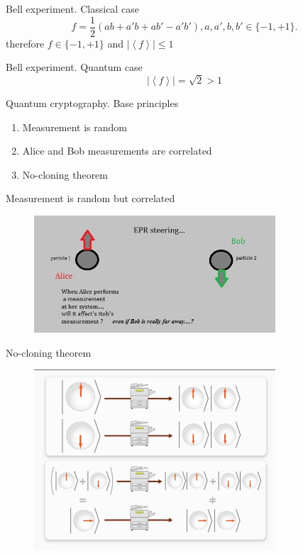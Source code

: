 \documentclass[10pt,pdf,hyperref={unicode}]{beamer}
\begin{document}
\begin{frame}{Bell experiment. Classical case}
\[
f = \frac{1}{2}\left(
a b + a' b + a b' - a' b'
\right), a,a',b,b' \in \{-1, +1\}.
\]
therefore
\(
f \in \{-1, +1\}
\)
and
\(
\left|\left<f\right>\right| \le 1
\)
\end{frame}

\begin{frame}{Bell experiment. Quantum case}
\[
\left|\left<f\right>\right| = \sqrt{2} > 1
\]
\end{frame}

\begin{frame}{Quantum cryptography. Base principles}
  \begin{enumerate}
  \item Measurement is random
  \item Alice and Bob measurements are correlated
  \item No-cloning theorem
  \end{enumerate}
\end{frame}

\begin{frame}{Measurement is random but correlated}
 \begin{figure} 
   \includegraphics[width=90mm,scale=0.5]{epr3.jpg}
  \end{figure}
\end{frame}

\begin{frame}{No-cloning theorem}
 \begin{figure} 
   \includegraphics[width=90mm,scale=0.5]{noclone.png}
  \end{figure}
\end{frame}
\end{document}
